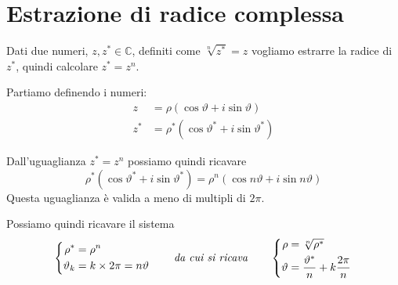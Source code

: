 \documentclass[../../analisi1]{subfiles}
\begin{document}
    \chapter{Estrazione di radice complessa}

        Dati due numeri, \(z, z^* \in \mathbb{C}\), definiti come \(\sqrt[n]{z^*} = z\) vogliamo estrarre la radice
        di \(z^*\), quindi calcolare \(z^* = z^n\).

        Partiamo definendo i numeri:
        \begin{align*}
            z &= \rho (\cos \vartheta + i \sin \vartheta)\\
            z^* &= \rho^* (\cos \vartheta^* + i \sin \vartheta^*)
        \end{align*}

        Dall'uguaglianza \(z^* = z^n\) possiamo quindi ricavare
        \[
            \rho^* (\cos \vartheta^* + i \sin \vartheta^*) = \rho^n (\cos n\vartheta + i \sin n\vartheta)
        \]
        Questa uguaglianza è valida a meno di multipli di \(2\pi\).

        Possiamo quindi ricavare il sistema
        \[
            \left\{
                \begin{aligned}
                    \rho^* &= \rho^n\\
                    \vartheta_k &= k \times 2\pi = n\vartheta
                \end{aligned}
            \right.
            \qquad \text{\emph{da cui si ricava}} \qquad
            \left\{
                \begin{aligned}
                    \rho &= \sqrt[n]{\rho^*}\\
                    \vartheta &= \frac{\vartheta^*}{n} + k \frac{2\pi}{n}
                \end{aligned}
            \right.
        \]
\end{document}
